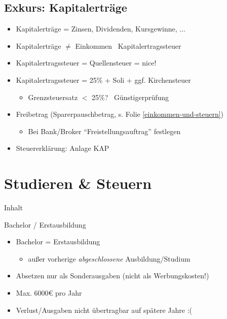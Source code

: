 \documentclass{beamer}
\begin{document}
		\subsection{Exkurs: Kapitalerträge}
		
			\begin{frame}
				\begin{itemize}
					\item Kapitalerträge = Zinsen, Dividenden, Kursgewinne, ...
					\item Kapitalerträge $\neq$ Einkommen \textrightarrow\ Kapitalertragssteuer\pause
					\item Kapitalertragssteuer = Quellensteuer = nice!
					\item Kapitalertragssteuer = 25\% + Soli + ggf. Kirchensteuer
					\begin{itemize}
						\item Grenzsteuersatz $<$ 25\%? \textrightarrow\ Günstigerprüfung
					\end{itemize}\pause
					\item Freibetrag (Sparerpauschbetrag, s. Folie \ref{einkommen-und-steuern})
					\begin{itemize}
						\item Bei Bank/Broker "`Freistellungsauftrag"' festlegen
					\end{itemize}
					\item Steuererklärung: Anlage KAP
				\end{itemize}
			\end{frame}
		
	\section{Studieren \& Steuern}
	
		\begin{frame}[t]{Inhalt}
		\end{frame}
	
		\begin{frame}{Bachelor / Erstausbildung}
			\begin{itemize}
				\item Bachelor = Erstausbildung
				\begin{itemize}
					\item außer vorherige \textit{abgeschlossene} Ausbildung/Studium
				\end{itemize}
				\item Absetzen nur als Sonderausgaben (nicht als Werbungskosten!)
				\item Max. 6000€ pro Jahr
				\item Verlust/Ausgaben nicht übertragbar auf spätere Jahre :(
			\end{itemize}
		\end{frame}
	
\end{document}
